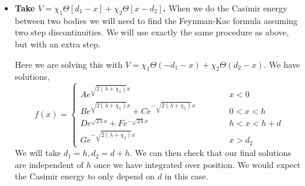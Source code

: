 \begin{itemize}
  \item \textbf{Take $V=\chi_1\Theta[d_1-x]+\chi_2\Theta[x-d_2]$.}
When we do the Casimir energy between two bodies we will need to find the Feynman-Kac formula assuming two step discontinuities.
  We will use exactly the same procedure as above, but with an extra step. 

Here we are solving this with $V = \chi_1\Theta(-d_1-x) + \chi_2\Theta(d_2-x)$.
We have solutions, 
\begin{equation}
f(x) = \left\{ \begin{array}{lcr}
A e^{\sqrt{2(\lambda+\chi_1)}x}   & \hspace{1cm} & x<0\\
B e^{\sqrt{2(\lambda+\chi_1)}x} + C e^{-\sqrt{2(\lambda+\chi_1)}x}  & \hspace{1cm} & 0<x<h\\
D e^{\sqrt{2\lambda}x} + F e^{-\sqrt{2\lambda}x}  & \hspace{1cm} & h<x<h+d\\
G e^{-\sqrt{2(\lambda+\chi_2)}x} & \hspace{1cm} & x>d_2
\end{array}
\right.
\end{equation}
We will take $d_1 = h, d_2 = d+h$.
  We can then check that our final solutions are independent of $h$ once we have integrated over position.
   We would expect the Casimir energy to only depend on $d$ in this case.   




\end{itemize}

